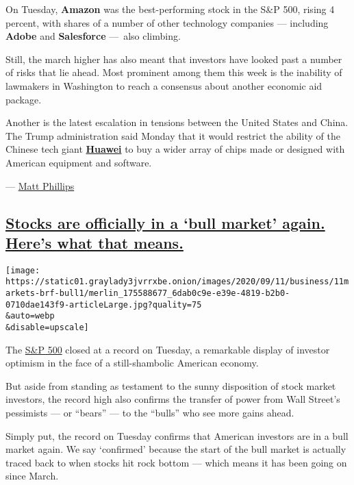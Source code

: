On Tuesday, \textbf{Amazon} was the best-performing stock in the S\&P
500, rising 4 percent, with shares of a number of other technology
companies --- including \textbf{Adobe} and \textbf{Salesforce} ---~also
climbing.

Still, the march higher has also meant that investors have looked past a
number of risks that lie ahead. Most prominent among them this week is
the inability of lawmakers in Washington to reach a consensus about
another economic aid package.

Another is the latest escalation in tensions between the United States
and China. The Trump administration said Monday that it would restrict
the ability of the Chinese tech giant
\textbf{\href{https://www.nytimes3xbfgragh.onion/2020/08/17/technology/trump-huawei-commerce-chips.html}{Huawei}}
to buy a wider array of chips made or designed with American equipment
and software.

--- \href{https://www.nytimes3xbfgragh.onion/by/matt-phillips}{Matt
Phillips}

\hypertarget{stocks-are-officially-in-a-bull-market-again-heres-what-that-means}{%
\subsection{\texorpdfstring{\protect\hyperlink{stocks-are-officially-in-a-bull-market-again-heres-what-that-means}{Stocks
are officially in a `bull market' again. Here's what that
means.}}{Stocks are officially in a `bull market' again. Here's what that means.}}\label{stocks-are-officially-in-a-bull-market-again-heres-what-that-means}}

\texttt{[image: https://static01.graylady3jvrrxbe.onion/images/2020/09/11/business/11markets-brf-bull1/merlin\_175588677\_6dab0c9e-e39e-4819-b2b0-0710dae143f9-articleLarge.jpg?quality=75\\\&auto=webp\\\&disable=upscale]}

The
\href{https://www.nytimes3xbfgragh.onion/live/2020/08/18/business/stock-market-today-coronavirus\#sp-500-hits-a-record-as-traders-looks-past-economic-devastation}{S\&P
500} closed at a record on Tuesday, a remarkable display of investor
optimism in the face of a still-shambolic American economy.

But aside from standing as testament to the sunny disposition of stock
market investors, the record high also confirms the transfer of power
from Wall Street's pessimists --- or ``bears'' --- to the ``bulls'' who
see more gains ahead.

Simply put, the record on Tuesday confirms that American investors are
in a bull market again. We say `confirmed' because the start of the bull
market is actually traced back to when stocks hit rock bottom --- which
means it has been going on since March.

